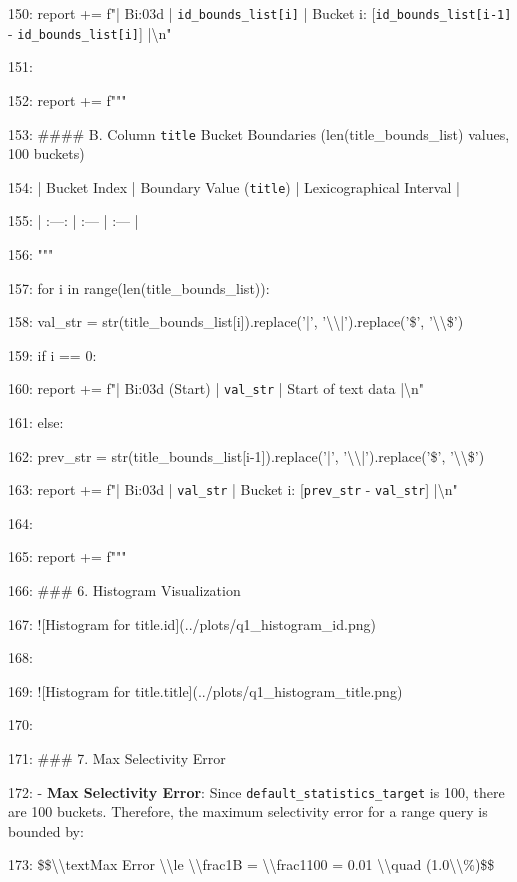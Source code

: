\documentclass[11pt,a4paper]{article}
\begin{document}
{150:             report += f"| B{i:03d} | \texttt{{id\_bounds\_list[i]}} | Bucket {i}: [\texttt{{id\_bounds\_list[i-1]}} - \texttt{{id\_bounds\_list[i]}}] |\textbackslash{}n"

151:

152:     report += f"""

153: \#\#\#\# B. Column \texttt{title} Bucket Boundaries ({len(title\_bounds\_list)} values, 100 buckets)

154: | Bucket Index | Boundary Value (\texttt{title}) | Lexicographical Interval |

155: | :---: | :--- | :--- |

156: """

157:     for i in range(len(title\_bounds\_list)):

158:         val\_str = str(title\_bounds\_list[i]).replace('|', '\textbackslash{}\textbackslash{}|').replace('\$', '\textbackslash{}\textbackslash{}\$')

159:         if i == 0:

160:             report += f"| B{i:03d} (Start) | \texttt{{val\_str}} | Start of text data |\textbackslash{}n"

161:         else:

162:             prev\_str = str(title\_bounds\_list[i-1]).replace('|', '\textbackslash{}\textbackslash{}|').replace('\$', '\textbackslash{}\textbackslash{}\$')

163:             report += f"| B{i:03d} | \texttt{{val\_str}} | Bucket {i}: [\texttt{{prev\_str}} - \texttt{{val\_str}}] |\textbackslash{}n"

164:

165:     report += f"""

166: \#\#\# 6. Histogram Visualization

167: ![Histogram for title.id](../plots/q1\_histogram\_id.png)

168:

169: ![Histogram for title.title](../plots/q1\_histogram\_title.png)

170:

171: \#\#\# 7. Max Selectivity Error

172: - \textbf{Max Selectivity Error}: Since \texttt{default\_statistics\_target} is 100, there are 100 buckets. Therefore, the maximum selectivity error for a range query is bounded by:

173: \$\$\textbackslash{}\textbackslash{}text{{Max Error}} \textbackslash{}\textbackslash{}le \textbackslash{}\textbackslash{}frac{{1}}{{B}} = \textbackslash{}\textbackslash{}frac{{1}}{{100}} = 0.01 \textbackslash{}\textbackslash{}quad (1.0\textbackslash{}\textbackslash{}\%)\$\$

}
\end{document}
